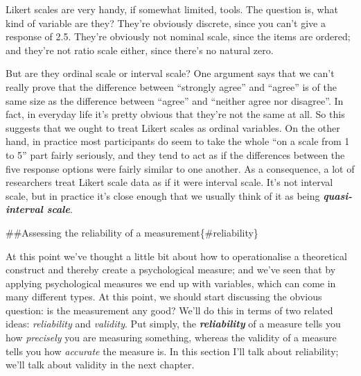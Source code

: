 \documentclass[]{book}
\begin{document}
Likert scales are very handy, if somewhat limited, tools. The question is, what kind of variable are they? They're obviously discrete, since you can't give a response of 2.5. They're obviously not nominal scale, since the items are ordered; and they're not ratio scale either, since there's no natural zero.

But are they ordinal scale or interval scale? One argument says that we can't really prove that the difference between ``strongly agree'' and ``agree'' is of the same size as the difference between ``agree'' and ``neither agree nor disagree''. In fact, in everyday life it's pretty obvious that they're not the same at all. So this suggests that we ought to treat Likert scales as ordinal variables. On the other hand, in practice most participants do seem to take the whole ``on a scale from 1 to 5'' part fairly seriously, and they tend to act as if the differences between the five response options were fairly similar to one another. As a consequence, a lot of researchers treat Likert scale data as if it were interval scale. It's not interval scale, but in practice it's close enough that we usually think of it as being \textbf{\emph{quasi-interval scale}}.

\#\#Assessing the reliability of a measurement\{\#reliability\}

At this point we've thought a little bit about how to operationalise a theoretical construct and thereby create a psychological measure; and we've seen that by applying psychological measures we end up with variables, which can come in many different types. At this point, we should start discussing the obvious question: is the measurement any good? We'll do this in terms of two related ideas: \emph{reliability} and \emph{validity}. Put simply, the \textbf{\emph{reliability}} of a measure tells you how \emph{precisely} you are measuring something, whereas the validity of a measure tells you how \emph{accurate} the measure is. In this section I'll talk about reliability; we'll talk about validity in the next chapter.
\end{document}
